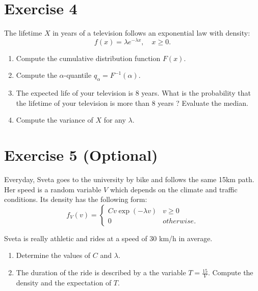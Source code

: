\documentclass[12pt,thmsa]{article}
\begin{document}
\section*{Exercise 4}

The lifetime $X$ in years of a television follows an exponential law with density:
\begin{equation*}
f(x)=\lambda e^{-\lambda x} ,\quad x\geq 0.
\end{equation*}
\begin{enumerate}
  \item Compute the cumulative distribution function $F(x)$.
  \item Compute the $\alpha$-quantile $q_\alpha=F^{-1}(\alpha)$.
  \item The expected life of your television is $8$ years. What is the probability that the lifetime of your television is more than $8$ years ?
  Evaluate the median.
  \item Compute the variance of $X$ for any $\lambda$.
\end{enumerate}


\section*{Exercise 5 (Optional)}
Everyday, Sveta goes to the university by bike and follows the same 15km path. Her speed is a random variable $V$ which depends on the climate and traffic conditions.
Its density has the following form:
\begin{equation*}
f_V(v)= \left\{
    \begin{array}{ll}
        C v \exp(-\lambda v) &  v\geq 0 \\
        0 & otherwise.
    \end{array}
\right.
\end{equation*}

Sveta is really athletic and rides at a speed of 30 km/h in average.
\begin{enumerate}
  \item Determine the values of $C$ and $\lambda$.
  \item The duration of the ride is described by a the variable $T= \frac{15}{V}$.
  Compute the density and the expectation of $T$.
\end{enumerate}
\end{document}
